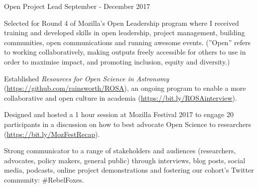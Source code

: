 \begin{cventries}
{    }
\cventry
    {Open Project Lead}
    {}
    {}
    {September - December 2017}
    {
      \begin{cvitems}
        \item{Selected for Round 4 of Mozilla's Open Leadership program where I received training and developed skills in open leadership, project management, building communities, open communications and running awesome events. (''Open'' refers to working collaboratively, making outputs freely accessible for others to use in order to maximise impact, and promoting inclusion, equity and diversity.)}
        \item{Established \textit{Resources for Open Science in Astronomy} (\url{https://github.com/rainsworth/ROSA}), an ongoing program to enable a more collaborative and open culture in academia (\url{https://bit.ly/ROSAinterview}).}
        \item {Designed and hosted a 1 hour session at Mozilla Festival 2017 to engage 20 participants in a discussion on how to best advocate Open Science to researchers (\url{https://bit.ly/MozFestRecap}).}
        \item {Strong communicator to a range of stakeholders and audiences (researchers, advocates, policy makers, general public) through interviews, blog posts, social media, podcasts, online project demonstrations and fostering our cohort's Twitter community: \#RebelFoxes.}
      \end{cvitems}
    }    
\end{cventries}
